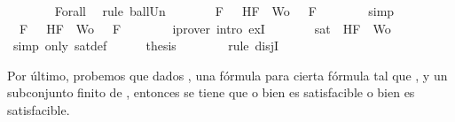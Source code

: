 \begin{isabellebody}
\ \ \ \ \ \ \isamarkupfalse%
\ Forall{}\ \isamarkupfalse%
\ {\isacharparenleft}rule\ ball{\isacharunderscore}Un{\isacharparenright}\isanewline
\ \ \ \ \isamarkupfalse%
\ \isamarkupfalse%
\ {\isachardoublequoteopen}{\isasymforall}F\ {\isasymin}\ {\isacharbraceleft}\isactrlbold {\isasymnot}\ H{\isacharcomma}F{\isacharbraceright}\ {\isasymunion}\ Wo{\isachardot}\ {\isasymA}\ {\isasymTurnstile}\ F{\isachardoublequoteclose}\isanewline
\ \ \ \ \ \ \isamarkupfalse%
\ simp\isanewline
\ \ \ \ \isamarkupfalse%
\ \isamarkupfalse%
\ {\isachardoublequoteopen}{\isasymexists}{\isasymA}{\isachardot}\ {\isasymforall}F\ {\isasymin}\ {\isacharparenleft}{\isacharbraceleft}\isactrlbold {\isasymnot}\ H{\isacharcomma}F{\isacharbraceright}\ {\isasymunion}\ Wo{\isacharparenright}{\isachardot}\ {\isasymA}\ {\isasymTurnstile}\ F{\isachardoublequoteclose}\isanewline
\ \ \ \ \ \ \isamarkupfalse%
\ {\isacharparenleft}iprover\ intro{\isacharcolon}\ exI{\isacharparenright}\isanewline
\ \ \ \ \isamarkupfalse%
\ \isamarkupfalse%
\ {\isachardoublequoteopen}sat\ {\isacharparenleft}{\isacharbraceleft}\isactrlbold {\isasymnot}\ H{\isacharcomma}F{\isacharbraceright}\ {\isasymunion}\ Wo{\isacharparenright}{\isachardoublequoteclose}\isanewline
\ \ \ \ \ \ \isamarkupfalse%
\ {\isacharparenleft}simp\ only{\isacharcolon}\ sat{\isacharunderscore}def{\isacharparenright}\isanewline
\ \ \ \ \isamarkupfalse%
\ {\isacharquery}thesis\isanewline
\ \ \ \ \ \ \isamarkupfalse%
\ {\isacharparenleft}rule\ disjI{}{\isacharparenright}\isanewline
\ \ \isamarkupfalse%
\isanewline
{}\isamarkupfalse%
%
\endisatagproof
{\isafoldproof}%
%
\isadelimproof
%
\endisadelimproof
%
\begin{isamarkuptext}%
Por último, probemos que dados , una fórmula  para cierta fórmula  tal 
  que ,  y  un subconjunto finito de , entonces se tiene que o bien 
   es satisfacible o bien  es satisfacible.%
\end{isamarkuptext}\isamarkuptrue%

\end{isabellebody}
